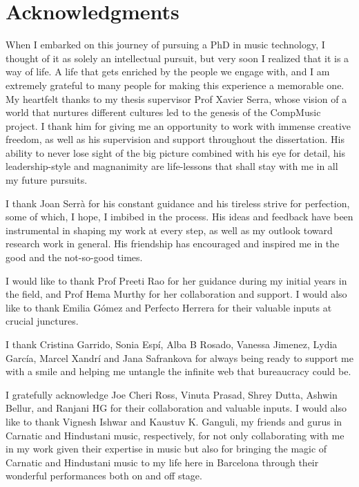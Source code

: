 \chapter*{Acknowledgments}

When I embarked on this journey of pursuing a PhD in music technology, I thought of it as solely an intellectual pursuit, but very soon I realized that it is a way of life. A life that gets enriched by the people we engage with, and I am extremely grateful to many people for making this experience a memorable one. My heartfelt thanks to my thesis supervisor Prof Xavier Serra, whose vision of a world that nurtures different cultures led to the genesis of the CompMusic project. I thank him for giving me an opportunity to work with immense creative freedom, as well as his supervision and support throughout the dissertation. His ability to never lose sight of the big picture combined with his eye for detail, his leadership-style and magnanimity are life-lessons that shall stay with me in all my future pursuits.

I thank Joan Serrà for his constant guidance and his tireless strive for perfection, some of which, I hope, I imbibed in the process. His ideas and feedback have been instrumental in shaping my work at every step, as well as my outlook toward research work in general. His friendship has encouraged and inspired me in the good and the not-so-good times. 

I would like to thank Prof Preeti Rao for her guidance during my initial years in the field, and Prof Hema Murthy for her collaboration and support. I would also like to thank Emilia Gómez and Perfecto Herrera for their valuable inputs at crucial junctures.  

I thank Cristina Garrido, Sonia Espí, Alba B Rosado, Vanessa Jimenez, Lydia García, Marcel Xandrí and Jana Safrankova for always being ready to support me with a smile and helping me untangle the infinite web that bureaucracy could be. 

I gratefully acknowledge Joe Cheri Ross, Vinuta Prasad, Shrey Dutta, Ashwin Bellur, and Ranjani HG for their collaboration and valuable inputs. I would also like to thank Vignesh Ishwar and Kaustuv K. Ganguli, my friends and gurus in Carnatic and Hindustani music, respectively, for not only collaborating with me in my work given their expertise in music but also for bringing the magic of Carnatic and Hindustani music to my life here in Barcelona through their wonderful performances both on and off stage.

